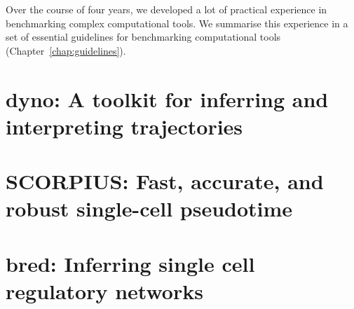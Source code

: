 Over the course of four years, we developed a lot of practical experience in benchmarking complex computational tools. We summarise this experience in a set of essential guidelines for benchmarking computational tools (Chapter~\ref{chap:guidelines}).


\section{dyno: A toolkit for inferring and interpreting trajectories}

\section{SCORPIUS: Fast, accurate, and robust single-cell pseudotime}




\section{bred: Inferring single cell regulatory networks}


